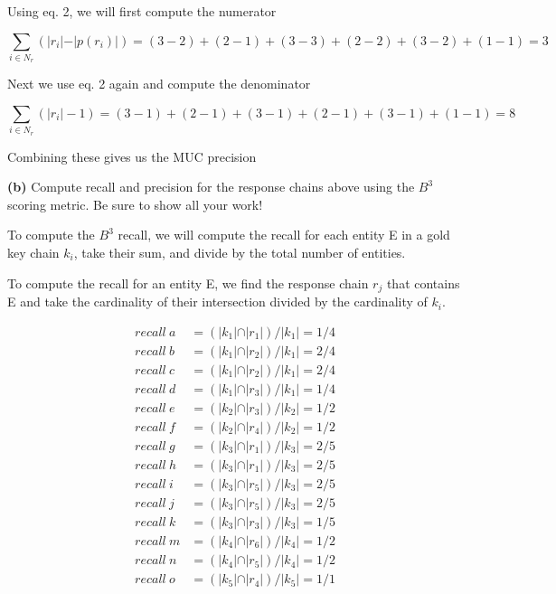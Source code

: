 \documentclass[11pt]{article}
\renewcommand\part[1]{\vspace{.10in}\textbf{(#1)}}
\begin{document}
Using eq. 2, we will first compute the numerator

$$\sum_{i \in N_r} ( \vert r_i \vert - \vert p(r_i) \vert ) = (3 - 2) + (2 - 1) + (3 - 3) + (2 - 2) + (3 - 2) + (1 - 1) = 3$$

Next we use eq. 2 again and compute the denominator

$$\sum_{i \in N_r} ( \vert r_i \vert - 1) = (3 - 1) + (2 - 1) + (3 - 1) + (2 - 1) + (3 - 1) + (1 - 1) = 8$$

Combining these gives us the MUC precision


\part{b} Compute recall and precision for the response chains above using the $B^3$ scoring metric. Be sure to show all your work!

To compute the $B^3$ recall, we will compute the recall for each entity E in a gold key chain $k_i$, take their sum, and divide by the total number of entities.

To compute the recall for an entity E, we find the response chain $r_j$ that contains E and take the cardinality of their intersection divided by the cardinality of $k_i$.

\begin{align*}
recall \ a &= (\vert k_1 \vert \cap \vert r_1 \vert) / \vert k_1 \vert = 1 / 4 \\
recall \ b &= (\vert k_1 \vert \cap \vert r_2 \vert) / \vert k_1 \vert =  2 / 4\\ 
recall \ c &= (\vert k_1 \vert \cap \vert r_2 \vert) / \vert k_1 \vert =  2 / 4\\
recall \ d &= (\vert k_1 \vert \cap \vert r_3 \vert) / \vert k_1 \vert =  1 / 4\\ 
recall \ e &= (\vert k_2 \vert \cap \vert r_3 \vert) / \vert k_2 \vert =  1 / 2\\ 
recall \ f &= (\vert k_2 \vert \cap \vert r_4 \vert) / \vert k_2 \vert =  1 / 2\\
recall \ g &= (\vert k_3 \vert \cap \vert r_1 \vert) / \vert k_3 \vert =  2 / 5\\ 
recall \ h &= (\vert k_3 \vert \cap \vert r_1 \vert) / \vert k_3 \vert =  2 / 5\\
recall \ i &= (\vert k_3 \vert \cap \vert r_5 \vert) / \vert k_3 \vert =  2 / 5\\
recall \ j &= (\vert k_3 \vert \cap \vert r_5 \vert) / \vert k_3 \vert =  2 / 5\\
recall \ k &= (\vert k_3 \vert \cap \vert r_3 \vert) / \vert k_3 \vert =  1 / 5\\
recall \ m &= (\vert k_4 \vert \cap \vert r_6 \vert) / \vert k_4 \vert =  1 / 2\\
recall \ n &= (\vert k_4 \vert \cap \vert r_5 \vert) / \vert k_4 \vert =  1 / 2\\
recall \ o &= (\vert k_5 \vert \cap \vert r_4 \vert) / \vert k_5 \vert = 1 / 1
\end{align*}
\end{document}
